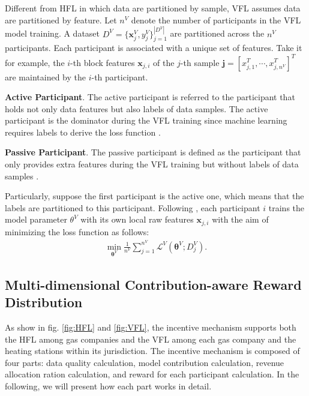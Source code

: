 \documentclass{article}
\begin{document}
Different from HFL in which data are partitioned by sample, VFL assumes data are partitioned by feature. Let $n^V$ denote the number of participants in the VFL model training. A dataset $D^V = \{\mathbf{x}^V_j, y^V_j\}_{j=1}^{|D^V|}$ are partitioned across the $n^V$ participants. Each participant is associated with a unique set of features. Take it for example, the $i$-th block features $\mathbf{x}_{j,i}$ of the $j$-th sample $\mathbf{j} = [x_{j,1}^T, \cdots, x_{j,n^V}^T]^T$ are maintained by the $i$-th participant. 

\textbf{Active Participant}. The active participant is referred to the participant that holds not only data features but also labels of data samples. The active participant is the dominator during the VFL training since machine learning requires labels to derive the loss function \cite{xia2021vertical}.

\textbf{Passive Participant}. The passive participant is defined as the participant that only provides extra features during the VFL training but without labels of data samples \cite{xia2021vertical}.

Particularly, suppose the first participant is the active one, which means that the labels are partitioned to this participant. Following \cite{liu2022vertical,yang2023survey}, each participant $i$ trains the model parameter $\theta^V$ with its own local raw features $\mathbf{x}_{j,i}$ with the aim of minimizing the loss function as follows:
\begin{equation}
\label{eq:vfl_goal}
\begin{aligned}
\min_{\mathbf{\theta}^V} \frac{1}{n^V}\sum_{j=1}^{n^V}  \mathcal{L}^V(\mathbf{\theta}^V;D^V_j).
\end{aligned}
\end{equation}

\subsection{Multi-dimensional Contribution-aware Reward Distribution}
As show in fig. \ref{fig:HFL} and \ref{fig:VFL}, the incentive mechanism supports both the HFL among gas companies and the VFL among each gas company and the heating stations within its jurisdiction. The incentive mechanism is composed of four parts: data quality calculation, model contribution calculation, revenue allocation ration calculation, and reward for each participant calculation. In the following, we will present how each part works in detail. 
\end{document}
